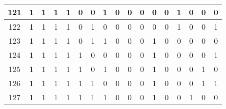 \documentclass[12pt, oneside, openany]{article}
\begin{document}
{\begin{longtable}[c]{|c||c|c|c|c|c|c|c||c|c|c|c|c|c|c|c|c|}
    \hline
    121 & 1 &  1 & 1 & 1 & 0 & 0 & 1 &  0 & 0 & 0 & 0 &  0 &  1 & 0 & 0 & 0 \\
    \hline
    122 & 1 &  1 & 1 & 1 & 0 & 1 & 0 &  0 & 0 & 0 & 0 &  0 &  1 & 0 & 0 & 1 \\
    \hline
    123 & 1 &  1 & 1 & 1 & 0 & 1 & 1 &  0 & 0 & 0 & 1 &  0 &  0 & 0 & 0 & 0 \\
    \hline
    124 & 1 &  1 & 1 & 1 & 1 & 0 & 0 &  0 & 0 & 0 & 1 &  0 &  0 & 0 & 0 & 1 \\
    \hline
    125 & 1 &  1 & 1 & 1 & 1 & 0 & 1 &  0 & 0 & 0 & 1 &  0 &  0 & 0 & 1 & 0 \\
    \hline
    126 & 1 &  1 & 1 & 1 & 1 & 1 & 0 &  0 & 0 & 0 & 1 &  0 &  0 & 0 & 1 & 1 \\
    \hline
    127 & 1 &  1 & 1 & 1 & 1 & 1 & 1 &  0 & 0 & 0 & 1 &  0 &  0 & 1 & 0 & 0 \\
    \hline
    
\end{longtable}

}

\newpage
\end{document}
